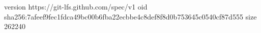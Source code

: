 version https://git-lfs.github.com/spec/v1
oid sha256:7afeef9fec1fdca49bc00b6fba22ecbbe4c8def8f8d0b753645c0540cf87d555
size 262240
